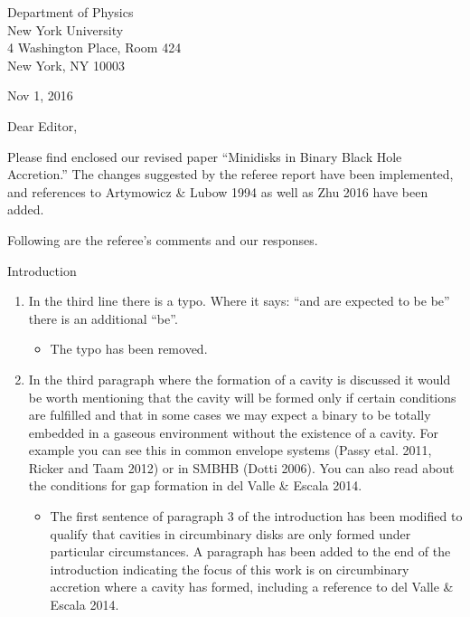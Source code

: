 \documentclass{letter}
\begin{document}
\begin{flushleft}
\begin{singlespace}
Department of Physics\\
New York University\\
4 Washington Place, Room 424\\
New York, NY 10003
\end{singlespace}

\vspace{0.5cm}

Nov 1, 2016

\vspace{0.5cm}

Dear Editor,


Please find enclosed our revised paper ``Minidisks in Binary Black Hole Accretion.'' The changes suggested by the referee report have been implemented, and references to Artymowicz \& Lubow 1994 as well as Zhu 2016 have been added.

Following are the referee's comments and our responses.

Introduction
\begin{enumerate}
\item In the third line there is a typo. Where it says: ``and are expected to be be'' there is an additional ``be''.
	\begin{itemize}
		\item The typo has been removed. 
	\end{itemize}

\item In the third paragraph where the formation of a cavity is discussed it would be worth mentioning that the cavity will be formed only if certain conditions are fulfilled and that in some cases we may expect a binary to be totally embedded in a gaseous environment without the existence of a cavity. For example you can see this in common envelope systems (Passy etal. 2011, Ricker and Taam 2012) or in SMBHB (Dotti 2006). You can also read about the conditions for gap formation in del Valle \& Escala 2014.
	\begin{itemize}
		\item The first sentence of paragraph 3 of the introduction has been modified to qualify that cavities in circumbinary disks are only formed under particular circumstances.  A paragraph has been added to the end of the introduction indicating the focus of this work is on circumbinary accretion where a cavity has formed, including a reference to del Valle \& Escala 2014.
	\end{itemize}
\end{enumerate}


\end{flushleft}
\end{document}
